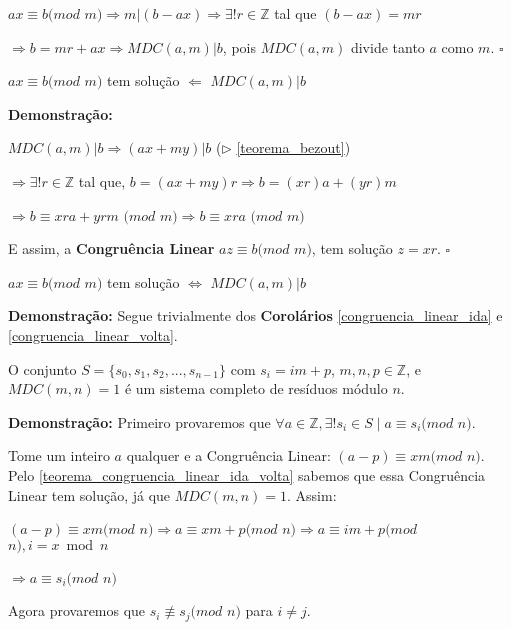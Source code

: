 $ax\equiv b(mod$ $m) \Rightarrow m|(b-ax) \Rightarrow \exists! r\in\mathbb{Z}$ tal que $(b-ax) = mr$

$\Rightarrow b = mr + ax \Rightarrow MDC(a,m)|b$, pois $MDC(a,m)$ divide tanto $a$ como $m$. $\square$



\begin{corollary}\label{congruencia_linear_volta}
$ax \equiv b (mod$ $m)$ tem solução $\Leftarrow$ $MDC(a,m)|b$
\end{corollary}
\textbf{Demonstração:}

$MDC(a,m)|b \Rightarrow (ax+my)|b$ ($\triangleright$ \autoref{teorema_bezout})

$\Rightarrow \exists!r\in\mathbb{Z}$ tal que, $b=(ax + my)r \Rightarrow b = (xr)a + (yr)m$

$\Rightarrow b \equiv xra + yrm$ $(mod$ $m) \Rightarrow b \equiv xra$ $(mod$ $m)$

E assim, a \textbf{Congruência Linear} $az\equiv b (mod$ $m)$, tem solução $z=xr$. $\square$

\begin{theorem}\label{teorema_congruencia_linear_ida_volta}
$ax \equiv b (mod$ $m)$ tem solução $\Leftrightarrow$ $MDC(a,m)|b$
\end{theorem}
\textbf{Demonstração:}
Segue trivialmente dos \textbf{Corolários} \autoref{congruencia_linear_ida} e \autoref{congruencia_linear_volta}.




\begin{theorem}\label{sistemo_completp_residuo}
O conjunto $S = \{s_0, s_1, s_2,..., s_{n-1}\}$ com $s_i = im + p$, $m, n, p \in \mathbb{Z}$, e $MDC(m,n) = 1$ é um sistema completo de resíduos módulo $n$.
\end{theorem}
\textbf{Demonstração:}
Primeiro provaremos que $\forall a \in \mathbb{Z}, \exists! s_i \in S \mid a \equiv s_i (mod$ $n)$.

Tome um inteiro $a$ qualquer e a Congruência Linear: $(a-p)\equiv xm(mod$ $n)$. Pelo \autoref{teorema_congruencia_linear_ida_volta} sabemos que essa Congruência Linear tem solução, já que $MDC(m,n)=1$. Assim:

$(a-p)\equiv xm(mod$ $n) \Rightarrow a\equiv xm+p(mod$ $n) \Rightarrow a\equiv im + p (mod$ $n), i=x\bmod n$

$\Rightarrow a\equiv s_i(mod$ $n)$

Agora provaremos que $s_i \not\equiv s_j (mod $ $n)$ para $i \neq j$.

